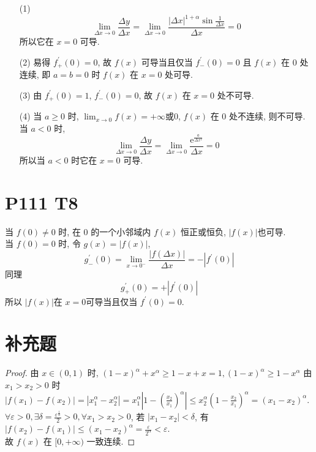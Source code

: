 \documentclass{article}
\newcommand{\zte}{\mathrm{e}} %
\begin{document}
\begin{itemize}
    \item [(1)] \[
        \lim_{\Delta  x \to 0}\frac{\Delta  y}{\Delta  x} 
        = \lim_{\Delta  x \to 0}\frac{\left\lvert \Delta x \right\rvert^{1 + \alpha} \sin \frac{1}{\Delta x}}{\Delta x} = 0
    \]
    所以它在 $x = 0$ 可导.
    \item [(2)] 易得 $f_+^\prime(0) = 0$, 故 $f(x)$ 可导当且仅当 $f_-^\prime(0) = 0$ 且 $f(x)$ 在 0 处连续, 即 $a = b = 0$ 时 $f(x)$ 在 $x = 0$ 处可导.
    \item [(3)] 由 $f_+^\prime(0) = 1$, $f_-^\prime(0) = 0$, 故 $f(x)$ 在 $x = 0$ 处不可导.
    \item [(4)] 当 $a \geqslant 0$ 时, $\displaystyle{\lim_{x \to 0}f(x) = + \infty \text{或}0}$, $f(x)$ 在 0 处不连续, 则不可导. \\
    当 $a < 0$ 时, \[
        \lim_{\Delta  x \to 0}\frac{\Delta  y}{\Delta  x}
         = \lim_{\Delta x \to 0}\frac{\zte^{\frac{a}{\Delta x^2}}}{\Delta x} = 0
    \]
    所以当 $a < 0$ 时它在 $x = 0$ 可导.
\end{itemize}

\section*{P111 T8}

当 $f(0) \neq 0$ 时, 在 0 的一个小邻域内 $f(x)$ 恒正或恒负, $\left\lvert f(x)\right\rvert $也可导. \\
当 $f(0) = 0$ 时, 令 $g(x) = \left\lvert f(x)\right\rvert $, $$g_-^\prime(0) = \lim_{x \to 0^-}\frac{\left\lvert f(\Delta x)\right\rvert}{\Delta x} = -\left\lvert f^\prime(0)\right\rvert $$同理
$$
g_+^\prime(0) = +\left\lvert f^\prime(0)\right\rvert
$$
所以 $\left\lvert f(x)\right\rvert $在 $x = 0$可导当且仅当 $f^\prime(0) = 0$.

\section*{补充题}

\begin{proof}
    由 $x \in (0, 1)$ 时, $(1 - x)^\alpha + x^\alpha \geqslant 1 - x + x = 1, (1 - x)^\alpha \geqslant 1 - x^\alpha$
    由 $x_1 > x_2 > 0$ 时 $\left\lvert f(x_1) - f(x_2)\right\rvert  = \left\lvert x_1^\alpha - x_2^\alpha\right\rvert = x_1^\alpha \left\lvert \displaystyle{1 - \left(\frac{x_2}{x_1}\right)^\alpha}\right\rvert \leqslant x_2^\alpha \left(1 - \displaystyle{\frac{x_2}{x_1}}\right)^\alpha = \left(x_1 - x_2\right)^\alpha$. \\
    $\displaystyle{\forall \varepsilon > 0, \exists \delta = \frac{\varepsilon^\frac{1}{\alpha}}{2}} > 0, \forall x_1 > x_2 > 0$, 若 $\left\lvert x_1 - x_2\right\rvert < \delta$, 有 $\left\lvert f(x_2) - f(x_1)\right\rvert \leqslant (x_1 - x_2)^\alpha = \displaystyle{\frac{\varepsilon}{2^\alpha}} < \varepsilon$. \\
    故 $f(x)$ 在 $[0, +\infty)$ 一致连续.
\end{proof}
\end{document}
